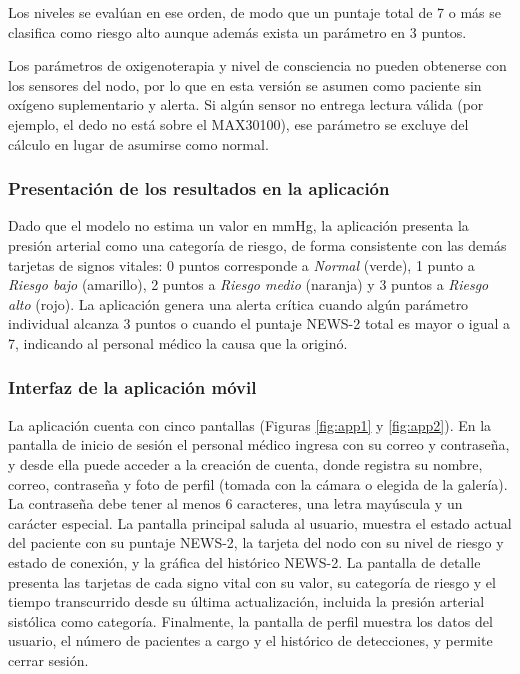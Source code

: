 \documentclass[11pt,a4paper]{article}
\begin{document}
Los niveles se evalúan en ese orden, de modo que un puntaje total de 7 o más se clasifica como riesgo alto aunque además exista un parámetro en 3 puntos.

Los parámetros de oxigenoterapia y nivel de consciencia no pueden obtenerse con los sensores del nodo, por lo que en esta versión se asumen como paciente sin oxígeno suplementario y alerta. Si algún sensor no entrega lectura válida (por ejemplo, el dedo no está sobre el MAX30100), ese parámetro se excluye del cálculo en lugar de asumirse como normal.

\subsubsection{Presentación de los resultados en la aplicación}

Dado que el modelo no estima un valor en mmHg, la aplicación presenta la presión arterial como una categoría de riesgo, de forma consistente con las demás tarjetas de signos vitales: 0 puntos corresponde a \textit{Normal} (verde), 1 punto a \textit{Riesgo bajo} (amarillo), 2 puntos a \textit{Riesgo medio} (naranja) y 3 puntos a \textit{Riesgo alto} (rojo). La aplicación genera una alerta crítica cuando algún parámetro individual alcanza 3 puntos o cuando el puntaje NEWS-2 total es mayor o igual a 7, indicando al personal médico la causa que la originó.

\subsubsection{Interfaz de la aplicación móvil}

La aplicación cuenta con cinco pantallas (Figuras \ref{fig:app1} y \ref{fig:app2}). En la pantalla de inicio de sesión el personal médico ingresa con su correo y contraseña, y desde ella puede acceder a la creación de cuenta, donde registra su nombre, correo, contraseña y foto de perfil (tomada con la cámara o elegida de la galería). La contraseña debe tener al menos 6 caracteres, una letra mayúscula y un carácter especial. La pantalla principal saluda al usuario, muestra el estado actual del paciente con su puntaje NEWS-2, la tarjeta del nodo con su nivel de riesgo y estado de conexión, y la gráfica del histórico NEWS-2. La pantalla de detalle presenta las tarjetas de cada signo vital con su valor, su categoría de riesgo y el tiempo transcurrido desde su última actualización, incluida la presión arterial sistólica como categoría. Finalmente, la pantalla de perfil muestra los datos del usuario, el número de pacientes a cargo y el histórico de detecciones, y permite cerrar sesión.
\end{document}
